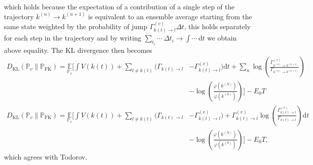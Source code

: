 which holds because the expectation of a contribution of a single step of the trajectory $k^{(n)} \rightarrow k^{(n+1)}$ is equivalent to an ensemble average starting from the same state weighted by the probability of jump $\Gamma_{k(t) \rightarrow l}^{(v)} \Delta t$, this holds separately for each step in the trajectory and by writing $\sum_{t_i} \cdots~\Delta t_i \rightarrow \int \cdots~\mathrm{d}t$ we obtain above equality. The KL divergence then becomes
\begin{equation}
	\begin{aligned}
		D_{\mathrm{KL}}\left(\mathbb{P}_{v} \| \mathbb{P}_{\mathrm{FK}}\right) = 
		\underset{\mathbb{P}_{v}}{\mathbb{E}}\Bigg[\int V(k(t))+\sum_{l \neq k(t)}\Big(\Gamma_{k(t) \rightarrow l}&-\Gamma_{k(t) \rightarrow l}^{(v)}\Big) \mathrm{d} t +\sum_{n} \log \left(\frac{\Gamma_{k^{(n)} \rightarrow k^{(n+1)}}^{(v)}}{\Gamma_{k^{(n)} \rightarrow k^{(n+1)}}}\right) \\
		&-\log \left(\frac{\varphi(k^{(N)})}{\varphi(k^{(0)})}\right)\Bigg]-E_{0} T 
	\end{aligned}
\end{equation}
\begin{equation}
\begin{aligned}
D_{\mathrm{KL}}\left(\mathbb{P}_{v} \| \mathbb{P}_{\mathrm{FK}}\right) = \underset{\mathbb{P}_{v}}{\mathbb{E}}\Bigg[\int V(k(t))+\sum_{l \neq k(t)}\big(\Gamma_{k(t) \rightarrow l}&-\Gamma_{k(t) \rightarrow l}^{(v)}\big)+\Gamma_{k(t) \rightarrow l}^{(v)} \log \left(\frac{\Gamma_{k(t) \rightarrow l}^{(v)}}{\Gamma_{k(t) \rightarrow l}}\right) \mathrm{d} t\\
&-\log \left(\frac{\varphi(k^{(N)})}{\varphi(k^{(0)})}\right)\Bigg]-E_{0} T,
\end{aligned}
\end{equation}
which agrees with Todorov.